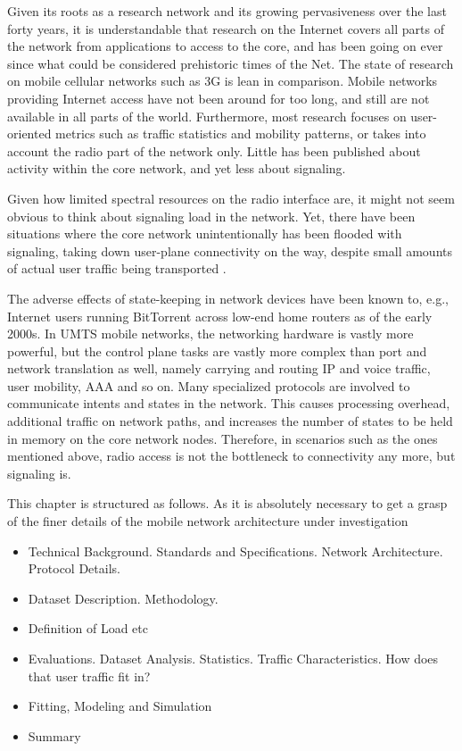 Given its roots as a research network and its growing pervasiveness over the last forty years, it is understandable that research on the Internet covers all parts of the network from applications to access to the core, and has been going on ever since what could be considered prehistoric times of the Net. The state of research on mobile cellular networks such as 3G is lean in comparison. Mobile networks providing Internet access have not been around for too long, and still are not available in all parts of the world. Furthermore, most research focuses on user-oriented metrics such as traffic statistics and mobility patterns, or takes into account the radio part of the network only. Little has been published about activity within the core network, and yet less about signaling.

Given how limited spectral resources on the radio interface are, it might not seem obvious to think about signaling load in the network. Yet, there have been situations where the core network unintentionally has been flooded with signaling, taking down user-plane connectivity on the way, despite small amounts of actual user traffic being transported \cite{lt2012docostorm, it2011birdandroid}. 

The adverse effects of state-keeping in network devices have been known to, e.g.,  Internet users running BitTorrent across low-end home routers as of the early 2000s. In \gls{UMTS} mobile networks, the networking hardware is vastly more powerful, but the control plane tasks are vastly more complex than port and network translation as well, namely carrying and routing IP and voice traffic, user mobility, \gls{AAA} and so on. Many specialized protocols are involved to communicate intents and states in the network. This causes processing overhead, additional traffic on network paths, and increases the number of states to be held in memory on the core network nodes. Therefore, in scenarios such as the ones mentioned above, radio access is not the bottleneck to connectivity any more, but signaling is.



This chapter is structured as follows. As it is absolutely necessary to get a grasp of the finer details of the mobile network architecture under investigation

\begin{itemize}
	\item Technical Background. Standards and Specifications. Network Architecture. Protocol Details.
	\item Dataset Description. Methodology.
	\item Definition of Load etc
	\item Evaluations. Dataset Analysis. Statistics. Traffic Characteristics. How does that user traffic fit in?
	\item Fitting, Modeling and Simulation
	\item Summary
\end{itemize}


